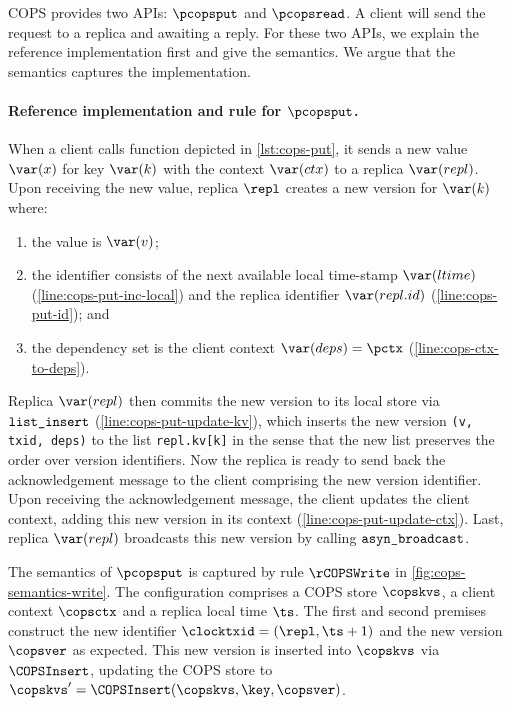 COPS provides two APIs: \( \pcopsput\) and \( \pcopsread\).
A client will send the request to a replica and awaiting a reply.
For these two APIs, we explain the reference implementation first and give the semantics.
We argue that the semantics captures the implementation.

\paragraph{Reference implementation and rule for \(\pcopsput\).} 
When a client calls \pcopsput function depicted in \cref{lst:cops-put},
it sends a new value \( \var(x) \) for key \( \var(k) \) 
with the context \( \var(ctx) \) to a replica  \( \var(repl) \).
Upon receiving the new value,  
replica \( \repl \) creates a new version for \( \var(k) \) where:
\begin{enumerate}
\item the value is \( \var(v) \);
\item the identifier consists of the next available local time-stamp \( \var(ltime) \) (\cref{line:cops-put-inc-local}) 
and the replica identifier \( \var(repl.id)\) (\cref{line:cops-put-id}); and
\item the dependency set is the client context \( \var(deps) = \pctx \) (\cref{line:cops-ctx-to-deps}).
\end{enumerate}
Replica \( \var(repl) \) then commits the new version to its local store via \( \verb|list_insert| \) (\cref{line:cops-put-update-kv}),
which inserts the new version \verb|(v, txid, deps)| to the list \verb|repl.kv[k]| 
in the sense that the new list preserves the order over version identifiers.
Now the replica is ready to send back the acknowledgement message to the client comprising the new version identifier.
Upon receiving the acknowledgement message, the client updates the client context,
adding this new version in its context (\cref{line:cops-put-update-ctx}).
Last, replica \( \var(repl) \) broadcasts this new version by calling \( \verb|asyn_broadcast| \).



The semantics of \(\pcopsput\) is captured by rule \(\rCOPSWrite\) in \cref{fig:cops-semantics-write}.
The configuration comprises a COPS store \( \copskvs \), a client context \( \copsctx \) and a replica local time  \( \ts \).
The first and second premises construct the new identifier \( \clocktxid = (\repl,\ts+1) \)
and the new version \( \copsver \) as expected.
This new version is inserted into \( \copskvs \) via \( \COPSInsert \),
updating the COPS store to \( \copskvs' = \COPSInsert(\copskvs, \key, \copsver)\).

